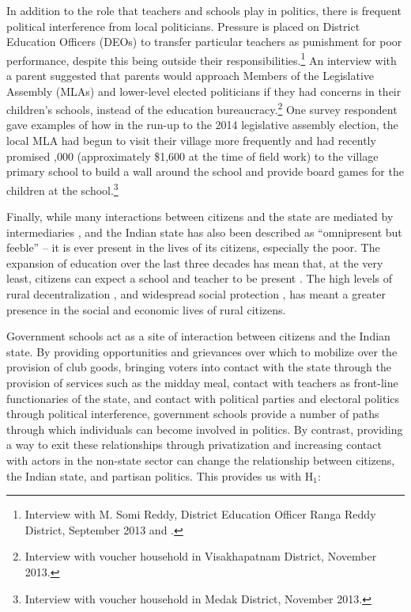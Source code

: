 \documentclass[hidelinks, 12pt, titlepage]{article}
\begin{document}
	In addition to the role that teachers and schools play in politics, there is frequent political interference from local politicians.  Pressure is placed on District Education Officers (DEOs) to transfer particular teachers as punishment for poor performance, despite this being outside their responsibilities.\footnote{Interview with M. Somi Reddy, District Education Officer Ranga Reddy District, September 2013 and \cite{Beteille2015}.}  An interview with a parent suggested that parents would approach Members of the Legislative Assembly (MLAs) and lower-level elected politicians if they had concerns in their children's schools, instead of the education bureaucracy.\footnote{Interview with voucher household in Visakhapatnam District, November 2013.}  One survey respondent gave examples of how in the run-up to the 2014 legislative assembly election, the local MLA had begun to visit their village more frequently and had recently promised ,000 (approximately \$1,600 at the time of field work) to the village primary school to build a wall around the school and provide board games for the children at the school.\footnote{Interview with voucher household in Medak District, November 2013.}

    Finally, while many interactions between citizens and the state are mediated by intermediaries \citep{Auerbach2016, Berenschot2010,Krishna2007}, and the Indian state has also been described as ``omnipresent but feeble'' \citep[6]{Kohli1990} -- it is ever present in the lives of its citizens, especially the poor.  The expansion of education over the last three decades has mean that, at the very least, citizens can expect a school and teacher to be present \citep{GovernmentofIndia2009}.  The high levels of rural decentralization \citep{Auerbach2020a,Kruks-Wisner2018}, and widespread social protection \citep{Kapur2013a}, has meant a greater presence in the social and economic lives of rural citizens.

	Government schools act as a site of interaction between citizens and the Indian state.  By providing opportunities and grievances over which to mobilize over the provision of club goods, bringing voters into contact with the state through the provision of services such as the midday meal, contact with teachers as front-line functionaries of the state, and contact with political parties and electoral politics through political interference, government schools provide a number of paths through which individuals can become involved in politics.  By contrast, providing a way to exit these relationships through privatization and increasing contact with actors in the non-state sector can change the relationship between citizens, the Indian state, and partisan politics.  This provides us with H$_{1}$:
\end{document}
